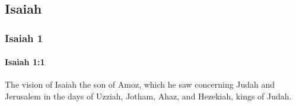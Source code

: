 \subsection{Isaiah}
	\label{ISAIAH}

	\subsubsection{Isaiah 1} %
		\label{ISAIAH-1}

		\paragraph{Isaiah 1:1} %
			\label{ISAIAH-1-1}

			The vision of Isaiah the son of Amoz, which he saw concerning Judah and Jerusalem in the days of Uzziah, Jotham, Ahaz, and Hezekiah, kings of Judah.

			\begin{framed}
			\scriptsize
				\begin{compactdesc}
					\item[LXX] 
				\end{compactdesc}
			\end{framed}

